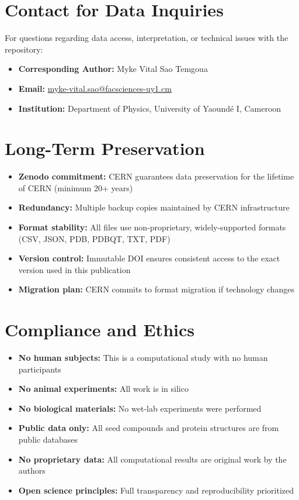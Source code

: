 \documentclass[11pt,a4paper]{article}
\begin{document}
\section*{Contact for Data Inquiries}

For questions regarding data access, interpretation, or technical issues with the repository:

\begin{itemize}[leftmargin=*]
\item \textbf{Corresponding Author:} Myke Vital Sao Temgoua
\item \textbf{Email:} \href{mailto:myke-vital.sao@facsciences-uy1.cm}{myke-vital.sao@facsciences-uy1.cm}
\item \textbf{Institution:} Department of Physics, University of Yaoundé I, Cameroon
\end{itemize}

\section*{Long-Term Preservation}

\begin{itemize}[leftmargin=*]
\item \textbf{Zenodo commitment:} CERN guarantees data preservation for the lifetime of CERN (minimum 20+ years)
\item \textbf{Redundancy:} Multiple backup copies maintained by CERN infrastructure
\item \textbf{Format stability:} All files use non-proprietary, widely-supported formats (CSV, JSON, PDB, PDBQT, TXT, PDF)
\item \textbf{Version control:} Immutable DOI ensures consistent access to the exact version used in this publication
\item \textbf{Migration plan:} CERN commits to format migration if technology changes
\end{itemize}

\section*{Compliance and Ethics}

\begin{itemize}[leftmargin=*]
\item \textbf{No human subjects:} This is a computational study with no human participants
\item \textbf{No animal experiments:} All work is in silico
\item \textbf{No biological materials:} No wet-lab experiments were performed
\item \textbf{Public data only:} All seed compounds and protein structures are from public databases
\item \textbf{No proprietary data:} All computational results are original work by the authors
\item \textbf{Open science principles:} Full transparency and reproducibility prioritized
\end{itemize}
\end{document}
